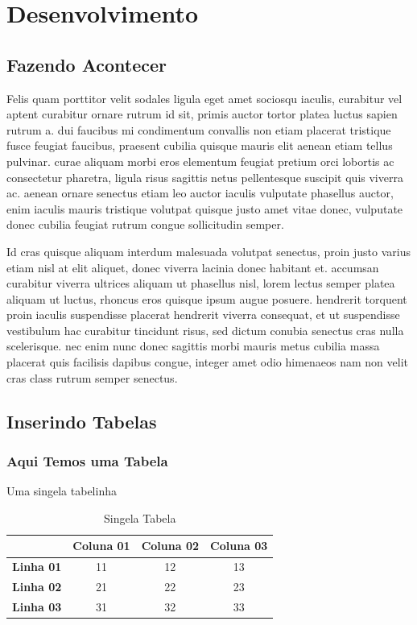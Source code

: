 \chapter{Desenvolvimento}
\lipsum[5-6]
\section{Fazendo Acontecer}
    Felis quam porttitor velit sodales ligula eget amet sociosqu iaculis, curabitur vel aptent curabitur ornare rutrum id sit, primis auctor tortor platea luctus sapien rutrum a. dui faucibus mi condimentum convallis non etiam placerat tristique fusce feugiat faucibus, praesent cubilia quisque mauris elit aenean etiam tellus pulvinar. curae aliquam morbi eros elementum feugiat pretium orci lobortis ac consectetur pharetra, ligula risus sagittis netus pellentesque suscipit quis viverra ac. aenean ornare senectus etiam leo auctor \cite{CARVALHOAMP:2012a} iaculis vulputate phasellus auctor, enim iaculis mauris tristique volutpat quisque justo amet vitae donec, vulputate donec cubilia feugiat rutrum congue sollicitudin semper. 

	Id cras quisque aliquam interdum malesuada volutpat senectus, proin justo varius etiam nisl at elit aliquet, donec viverra lacinia donec habitant et. accumsan curabitur viverra ultrices aliquam ut phasellus nisl, lorem lectus semper platea aliquam ut luctus, rhoncus eros quisque ipsum augue posuere. hendrerit torquent proin iaculis suspendisse placerat hendrerit viverra consequat, et ut suspendisse vestibulum hac curabitur tincidunt risus, sed dictum conubia senectus cras nulla scelerisque. nec enim nunc donec sagittis morbi mauris metus cubilia massa placerat quis facilisis dapibus congue, integer amet odio himenaeos nam non velit cras class rutrum semper senectus.
\section{Inserindo Tabelas}
\lipsum[7-8]
\subsection{Aqui Temos uma Tabela}
Uma singela tabelinha
\begin{table}[htb]
    \centering
    \caption{Singela Tabela}
    \label{tab:my-table}
    \begin{tabular}{c|c|c|c|}
    \cline{2-4}
     & \textbf{Coluna 01} & \textbf{Coluna 02} & \textbf{Coluna 03} \\ \hline
    \multicolumn{1}{|c|}{\textbf{Linha 01}} & 11 & 12 & 13 \\ \hline
    \multicolumn{1}{|c|}{\textbf{Linha 02}} & 21 & 22 & 23 \\ \hline
    \multicolumn{1}{|c|}{\textbf{Linha 03}} & 31 & 32 & 33 \\ \hline
    \end{tabular}
\end{table}
